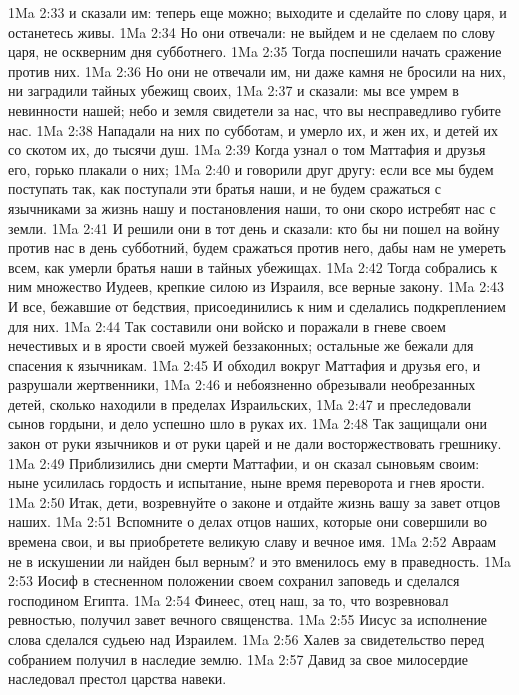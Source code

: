 \vs 1Ma 2:33 и сказали им: теперь еще можно; выходите и сделайте по слову царя, и останетесь живы.
\vs 1Ma 2:34 Но они отвечали: не выйдем и не сделаем по слову царя, не оскверним дня субботнего.
\vs 1Ma 2:35 Тогда поспешили начать сражение против них.
\vs 1Ma 2:36 Но они не отвечали им, ни даже камня не бросили на них, ни заградили тайных убежищ своих,
\vs 1Ma 2:37 и сказали: мы все умрем в невинности нашей; небо и земля свидетели за нас, что вы несправедливо губите нас.
\vs 1Ma 2:38 Нападали на них по субботам, и умерло их, и жен их, и детей их со скотом их, до тысячи душ.
\vs 1Ma 2:39 Когда узнал о том Маттафия и друзья его, горько плакали о них;
\vs 1Ma 2:40 и говорили друг другу: если все мы будем поступать так, как поступали эти братья наши, и не будем сражаться с язычниками за жизнь нашу и постановления наши, то они скоро истребят нас с земли.
\vs 1Ma 2:41 И решили они в тот день и сказали: кто бы ни пошел на войну против нас в день субботний, будем сражаться против него, дабы нам не умереть всем, как умерли братья наши в тайных убежищах.
\vs 1Ma 2:42 Тогда собрались к ним множество Иудеев, крепкие силою из Израиля, все верные закону.
\vs 1Ma 2:43 И все, бежавшие от бедствия, присоединились к ним и сделались подкреплением для них.
\vs 1Ma 2:44 Так составили они войско и поражали в гневе своем нечестивых и в ярости своей мужей беззаконных; остальные же бежали для спасения к язычникам.
\vs 1Ma 2:45 И обходил вокруг Маттафия и друзья его, и разрушали жертвенники,
\vs 1Ma 2:46 и небоязненно обрезывали необрезанных детей, сколько находили в пределах Израильских,
\vs 1Ma 2:47 и преследовали сынов гордыни, и дело успешно шло в руках их.
\vs 1Ma 2:48 Так защищали они закон от руки язычников и от руки царей и не дали восторжествовать грешнику.
\rsbpar\vs 1Ma 2:49 Приблизились дни смерти Маттафии, и он сказал сыновьям своим: ныне усилилась гордость и испытание, ныне время переворота и гнев ярости.
\vs 1Ma 2:50 Итак, дети, возревнуйте о законе и отдайте жизнь вашу за завет отцов наших.
\vs 1Ma 2:51 Вспомните о делах отцов наших, которые они совершили во времена свои, и вы приобретете великую славу и вечное имя.
\vs 1Ma 2:52 Авраам не в искушении ли найден был верным? и это вменилось ему в праведность.
\vs 1Ma 2:53 Иосиф в стесненном положении своем сохранил заповедь и сделался господином Египта.
\vs 1Ma 2:54 Финеес, отец наш, за то, что возревновал ревностью, получил завет вечного священства.
\vs 1Ma 2:55 Иисус за исполнение слова сделался судьею над Израилем.
\vs 1Ma 2:56 Халев за свидетельство перед собранием получил в наследие землю.
\vs 1Ma 2:57 Давид за свое милосердие наследовал престол царства навеки.

